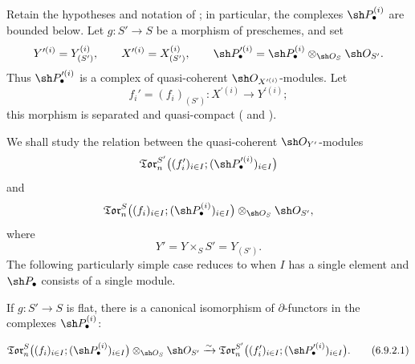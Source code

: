 \begin{env}[6.9.1]
\label{III.6.9.1}
Retain the hypotheses and notation of ; in
particular, the complexes $\sh P_\bullet^{(i)}$ are bounded below.
Let $g:S'\to S$ be a morphism of preschemes, and set
\[
  Y^{\prime(i)}=Y_{(S')}^{(i)},
  \qquad
  X^{\prime(i)}=X_{(S')}^{(i)},
  \qquad
  \sh P_\bullet^{\prime(i)}
  =
  \sh P_\bullet^{(i)}
  \otimes_{\sh O_S}\sh O_{S'}.
\]
Thus $\sh P_\bullet^{\prime(i)}$ is a complex of quasi-coherent
$\sh O_{X^{\prime(i)}}$-modules.  Let
\[
  f_i'=(f_i)_{(S')}:
  X^{\prime(i)}\longrightarrow Y^{\prime(i)};
\]
this morphism is separated and quasi-compact
( and ).

We shall study the relation between the quasi-coherent
$\sh O_{Y'}$-modules
\[
  \mathfrak{Tor}_n^{S'}
  \bigl(
    (f_i')_{i\in I};
    (\sh P_\bullet^{\prime(i)})_{i\in I}
  \bigr)
\]
and
\[
  \mathfrak{Tor}_n^S
  \bigl(
    (f_i)_{i\in I};
    (\sh P_\bullet^{(i)})_{i\in I}
  \bigr)
  \otimes_{\sh O_S}\sh O_{S'},
\]
where
\[
  Y'=Y\times_SS'=Y_{(S')}.
\]
The following particularly simple case reduces to
 when $I$ has a single element and
$\sh P_\bullet$ consists of a single module.
\end{env}

\begin{proposition}[6.9.2]
\label{III.6.9.2}
If $g:S'\to S$ is flat, there is a canonical isomorphism of
$\partial$-functors in the complexes $\sh P_\bullet^{(i)}$:
\begin{env}[6.9.2.1]
\label{III.6.9.2.1}
\[
  \mathfrak{Tor}_n^S
  \bigl(
    (f_i)_{i\in I};
    (\sh P_\bullet^{(i)})_{i\in I}
  \bigr)
  \otimes_{\sh O_S}\sh O_{S'}
  \xrightarrow{\sim}
  \mathfrak{Tor}_n^{S'}
  \bigl(
    (f_i')_{i\in I};
    (\sh P_\bullet^{\prime(i)})_{i\in I}
  \bigr).
  \tag{6.9.2.1}\label{III.6.9.2.1.eq}
\]
\end{env}
\end{proposition}

